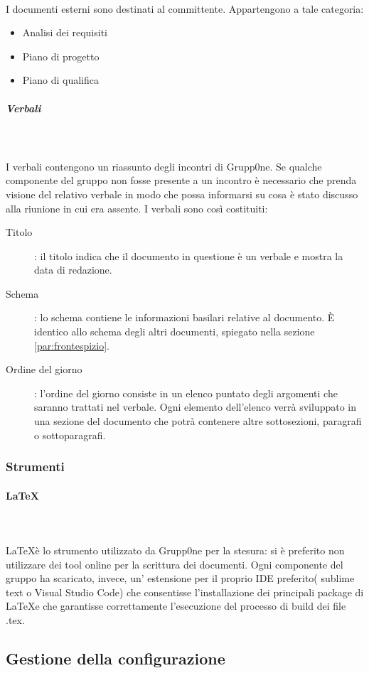 \documentclass[../norme-di-progetto.tex]{subfiles}
\begin{document}
\label{subp:esterni}
\\ I documenti esterni sono destinati al committente. Appartengono a tale categoria:
\begin{itemize}
	\item Analisi dei requisiti
	\item Piano di progetto
	\item Piano di qualifica
\end{itemize}
\subparagraph{Verbali}\mbox{}\\
\label{subp:verbali}
\\ I verbali contengono un riassunto degli incontri di Grupp0ne. Se qualche componente del gruppo non fosse presente a un incontro è necessario che prenda visione del relativo verbale in modo che possa informarsi su cosa è stato discusso alla riunione in cui era assente. I verbali sono così costituiti:
\begin{description}
	\item [Titolo]: il titolo indica che il documento in questione è un verbale e mostra la data di redazione.
	\item [Schema]: lo schema contiene le informazioni basilari relative al documento. È identico allo schema degli altri documenti, spiegato nella sezione \ref{par:frontespizio}.
	\item [Ordine del giorno]: l'ordine del giorno consiste in un elenco puntato degli argomenti che saranno trattati nel verbale. Ogni elemento dell'elenco verrà sviluppato in una sezione del documento che potrà contenere altre sottosezioni, paragrafi o sottoparagrafi.
\end{description}
\subsubsection{Strumenti}
\paragraph {\LaTeX}\mbox{}\\
\label{par:LaTeX}
\\ \LaTeX  è lo strumento utilizzato da Grupp0ne per la stesura: si è preferito non utilizzare dei tool online per la scrittura dei documenti. Ogni componente del gruppo ha scaricato, invece, un' estensione per il proprio IDE preferito( sublime text o Visual Studio Code) che consentisse l'installazione dei principali package di \LaTeX e che garantisse correttamente l'esecuzione del processo di build dei file .tex.
\subsection{Gestione della configurazione}
\label{sub:gestione della configurazione}
\end{document}
